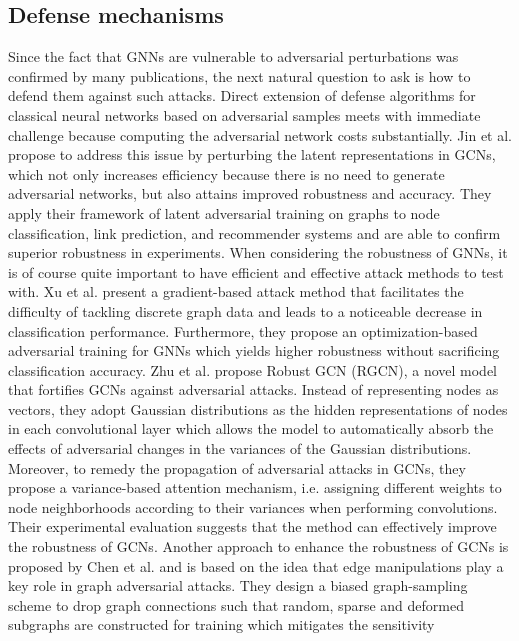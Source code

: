\documentclass[a4paper,preprint]{sig-alternate}
\begin{document}
\subsection{Defense mechanisms}
\label{sec:rev2}

Since the fact that GNNs are vulnerable to adversarial perturbations was confirmed by many publications, the next natural question to ask
is how to defend them against such attacks. 
Direct extension of defense algorithms for classical neural networks based on adversarial samples meets with immediate challenge because
computing the adversarial network costs substantially. \cite{Jin_2020} Jin et al. propose to address this issue by perturbing the latent 
representations in GCNs, which not only increases efficiency because there is no need to generate adversarial networks, but also attains 
improved robustness and accuracy. They apply their framework of latent adversarial training on graphs to node classification,
link prediction, and recommender systems and are able to confirm superior robustness in experiments.
When considering the robustness of GNNs, it is of course quite important to have efficient and effective attack methods to test with.
Xu et al. \cite{xu2019topology} present a gradient-based attack method that facilitates the difficulty of tackling discrete graph data
and leads to a noticeable decrease in classification performance. Furthermore, they propose an optimization-based adversarial training
for GNNs which yields higher robustness without sacrificing classification accuracy.
Zhu et al. \cite{10.1145/3292500.3330851} propose Robust GCN (RGCN), a novel model that fortifies GCNs against adversarial attacks.
Instead of representing  nodes as vectors, they adopt Gaussian distributions as the hidden representations of nodes in each
convolutional layer which allows the model to automatically absorb the effects of adversarial changes in the variances of the Gaussian distributions.
Moreover, to remedy the propagation of adversarial attacks in GCNs, they propose a variance-based attention mechanism, i.e. assigning different
weights to node neighborhoods according to their variances when performing convolutions. Their experimental evaluation suggests that
the method can effectively improve the robustness of GCNs.
Another approach to enhance the robustness of GCNs is proposed by Chen et al. \cite{Chen_2020} and is based on the idea that
edge manipulations play a key role in graph adversarial attacks. They design a biased graph-sampling scheme to drop graph connections
such that random, sparse and deformed subgraphs are constructed for training which mitigates the sensitivity 
\end{document}
